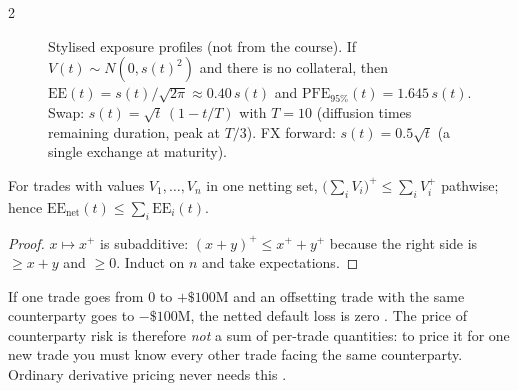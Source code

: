 \begin{paracol}{2}
\begin{figure}[ht]
\centering
{}
\caption{Stylised exposure profiles (not from the course). If $V(t)\sim N(0,s(t)^2)$ and there is no
collateral, then $\mathrm{EE}(t)=s(t)/\sqrt{2\pi}\approx0.40\,s(t)$ and $\mathrm{PFE}_{95\%}(t)=1.645\,s(t)$.
Swap: $s(t)=\sqrt t\,(1-t/T)$ with $T=10$ (diffusion times remaining duration, peak at $T/3$).
FX forward: $s(t)=0.5\sqrt t$ (a single exchange at maturity).}\label{ch08:fig-exposure}
\end{figure}

\begin{proposition}\label{ch08:prop-netting}
For trades with values $V_1,\dots,V_n$ in one netting set,
$\bigl(\sum_iV_i\bigr)^+\le\sum_iV_i^+$ pathwise; hence $\mathrm{EE}_{\text{net}}(t)\le\sum_i\mathrm{EE}_i(t)$.
\end{proposition}
\begin{proof}
$x\mapsto x^+$ is subadditive: $(x+y)^+\le x^++y^+$ because the right side is $\ge x+y$ and $\ge0$.
Induct on $n$ and take expectations.
\end{proof}
If one trade goes from $0$ to $+\$100$M and an offsetting trade with the same counterparty goes to $-\$100$M, the
netted default loss is zero . The price of counterparty risk is therefore \emph{not} a sum of
per-trade quantities: to price it for one new trade you must know every other trade facing the same
counterparty. Ordinary derivative pricing never needs this .


\end{paracol}
